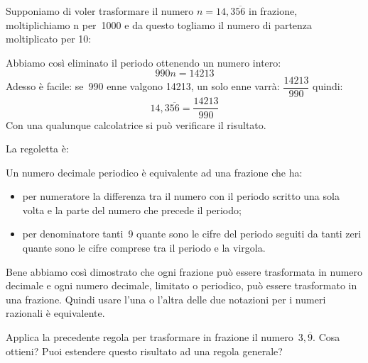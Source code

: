 Supponiamo di voler trasformare il numero \(n = 14,3\overline{56}\) in
frazione, moltiplichiamo n per~1000 e da questo togliamo il numero di
partenza moltiplicato per 10:

\begin{center}
 \begin{center}\end{center}
\end{center}

Abbiamo così eliminato il periodo ottenendo un numero intero:
\[990n = 14213\]
Adesso è facile: se~990 enne valgono 14213, un solo enne varrà:
\(\dfrac{14213}{990}\)
quindi:
\[14,3\overline{56} = \frac{14213}{990}\]
Con una qualunque calcolatrice si può verificare il risultato.

La regoletta è:

\begin{teorema}
 Un numero decimale periodico è equivalente ad una frazione che ha:
\begin{itemize}
 \item per numeratore la differenza tra il numero con il periodo scritto
una sola volta e la parte del numero che precede il periodo;
 \item per denominatore tanti~9 quante sono le cifre del periodo seguiti da
tanti zeri quante sono le cifre comprese tra il periodo e la virgola.
\end{itemize}
\end{teorema}

Bene abbiamo così dimostrato che ogni frazione può essere trasformata in
numero decimale e ogni numero decimale, limitato o periodico, può essere
trasformato in una frazione. Quindi usare l'una o l'altra delle due
notazioni per i numeri razionali è equivalente.

\begin{osservazione}
 Applica la precedente regola per trasformare in frazione il
 numero~\(3,\overline{9}\). Cosa ottieni? Puoi estendere questo risultato
ad una regola generale?
\end{osservazione}


